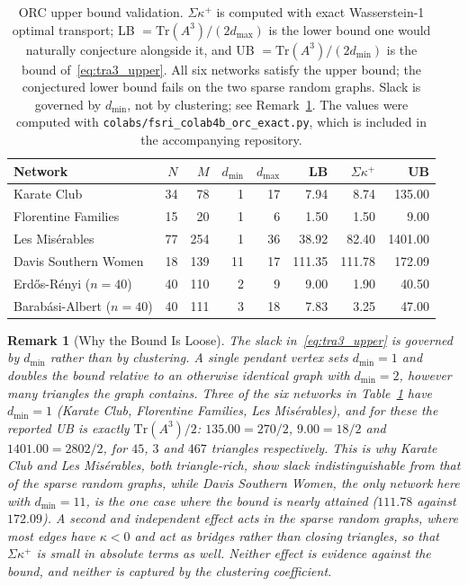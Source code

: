 \documentclass[11pt,a4paper]{article}
\newtheorem{remark}{Remark}
\begin{document}
\begin{table}[ht]
\centering
\caption{ORC upper bound validation. $\Sigma\kappa^+$ is computed with exact
Wasserstein-1 optimal transport; LB $= \text{Tr}(A^3)/(2d_{\max})$ is the
lower bound one would naturally conjecture alongside it, and
UB $= \text{Tr}(A^3)/(2d_{\min})$ is the bound of~\eqref{eq:tra3_upper}.
All six networks satisfy the upper bound; the conjectured lower bound fails
on the two sparse random graphs. Slack is governed by $d_{\min}$, not by
clustering; see Remark~\ref{rem:loose_bound}. The values were computed with
\texttt{colabs/fsri\_colab4b\_orc\_exact.py}, which is included in the
accompanying repository.}
\label{tab:orc_bounds}
\small
\begin{tabular}{lrrrrrrr}
\toprule
Network & $N$ & $M$ & $d_{\min}$ & $d_{\max}$ & LB & $\Sigma\kappa^+$ & UB \\
\midrule
Karate Club~\cite{zachary1977}         & 34 & 78  & 1  & 17 & 7.94   & 8.74   & 135.00  \\
Florentine Families~\cite{padgett1993} & 15 & 20  & 1  & 6  & 1.50   & 1.50   & 9.00    \\
Les Mis\'{e}rables                     & 77 & 254 & 1  & 36 & 38.92  & 82.40  & 1401.00 \\
Davis Southern Women                   & 18 & 139 & 11 & 17 & 111.35 & 111.78 & 172.09  \\
\midrule
Erd\H{o}s-R\'{e}nyi ($n{=}40$)         & 40 & 110 & 2  & 9  & 9.00   & 1.90   & 40.50   \\
Barab\'{a}si-Albert ($n{=}40$)         & 40 & 111 & 3  & 18 & 7.83   & 3.25   & 47.00   \\
\bottomrule
\end{tabular}
\end{table}

\begin{remark}[Why the Bound Is Loose]
\label{rem:loose_bound}
The slack in~\eqref{eq:tra3_upper} is governed by $d_{\min}$ rather
than by clustering. A single pendant vertex sets $d_{\min} = 1$ and
doubles the bound relative to an otherwise identical graph with
$d_{\min} = 2$, however many triangles the graph contains. Three of
the six networks in Table~\ref{tab:orc_bounds} have $d_{\min} = 1$
(Karate Club, Florentine Families, Les Mis\'{e}rables), and for these
the reported UB is exactly $\text{Tr}(A^3)/2$: $135.00 = 270/2$,
$9.00 = 18/2$ and $1401.00 = 2802/2$, for $45$, $3$ and $467$
triangles respectively. This is why Karate Club and Les
Mis\'{e}rables, both triangle-rich, show slack indistinguishable from
that of the sparse random graphs, while Davis Southern Women, the only
network here with $d_{\min} = 11$, is the one case where the bound is
nearly attained ($111.78$ against $172.09$). A second and independent
effect acts in the sparse random graphs, where most edges have
$\kappa < 0$ and act as bridges rather than closing triangles, so that
$\Sigma\kappa^+$ is small in absolute terms as well. Neither effect is
evidence against the bound, and neither is captured by the clustering
coefficient.
\end{remark}
\end{document}
